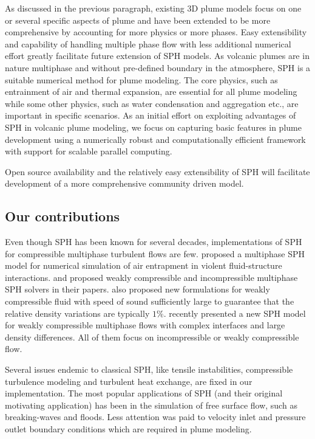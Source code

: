 \documentclass[gmd, manuscript]{copernicus}
\begin{document}
As discussed in the previous paragraph, existing 3D plume models focus on one or several specific aspects of plume and have been extended to be more comprehensive by accounting for more physics or more phases. Easy extensibility and capability of handling multiple phase flow with less additional numerical effort greatly facilitate future extension of SPH models. As volcanic plumes are in nature multiphase and without pre-defined boundary in the atmosphere, SPH is a suitable numerical method for plume modeling. The core physics, such as entrainment of air and thermal expansion, are essential for all plume modeling while some other physics, such as water condensation and aggregation etc., are important in specific scenarios. As an initial effort on exploiting advantages of SPH in volcanic plume modeling, we focus on capturing basic features in plume development using a numerically robust and computationally efficient framework with support for scalable parallel computing. %

Open source availability and the relatively easy extensibility of SPH will facilitate development of a more comprehensive community driven model.

\subsection{Our contributions}
Even though SPH has been known for several decades, implementations of SPH for compressible multiphase turbulent flows are few. \citet{colagrossi2003numerical} proposed a multiphase SPH model for numerical simulation of air entrapment in violent fluid-structure interactions. \citet{hu2007incompressible} and \citet{adami2010new} proposed weakly compressible and incompressible multiphase SPH solvers in their papers. \citet{monaghan2013simple} also proposed new formulations for weakly compressible fluid with speed of sound sufficiently large to guarantee that the relative density variations are typically $1\%$. \citet {chen2015sph} recently presented a new SPH model for weakly compressible multiphase flows with complex interfaces and large density differences. All of them focus on incompressible or weakly compressible flow.

Several issues endemic to classical SPH, like tensile instabilities,  compressible turbulence modeling and turbulent heat exchange, are fixed in our implementation. The most popular applications of SPH (and their original motivating application) has been in the simulation of free surface flow, such as breaking-waves and floods. Less attention was paid to velocity inlet and pressure outlet boundary conditions which are required in plume modeling.
 
\end{document}

